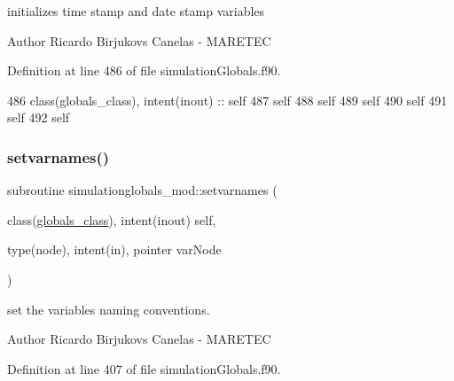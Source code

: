 initializes time stamp and date stamp variables 

\begin{DoxyAuthor}{Author}
Ricardo Birjukovs Canelas -\/ M\+A\+R\+E\+T\+EC 
\end{DoxyAuthor}


Definition at line 486 of file simulation\+Globals.\+f90.


\begin{DoxyCode}
486     \textcolor{keywordtype}{class}(globals\_class), \textcolor{keywordtype}{intent(inout)} :: self
487     self%
488     self%
489     self%
490     self%
491     self%
492     self%
\end{DoxyCode}
\mbox{\label{namespacesimulationglobals__mod_a2c6fa0a9123d06b2110258ea200f4f52}} 
\subsubsection{\texorpdfstring{setvarnames()}{setvarnames()}}
{\footnotesize\ttfamily subroutine simulationglobals\+\_\+mod\+::setvarnames (\begin{DoxyParamCaption}\item[{class(\mbox{\hyperlink{structsimulationglobals__mod_1_1globals__class}{globals\+\_\+class}}), intent(inout)}]{self,  }\item[{type(node), intent(in), pointer}]{var\+Node }\end{DoxyParamCaption})\hspace{0.3cm}{\ttfamily [private]}}



set the variables naming conventions. 

\begin{DoxyAuthor}{Author}
Ricardo Birjukovs Canelas -\/ M\+A\+R\+E\+T\+EC 
\end{DoxyAuthor}


Definition at line 407 of file simulation\+Globals.\+f90.


